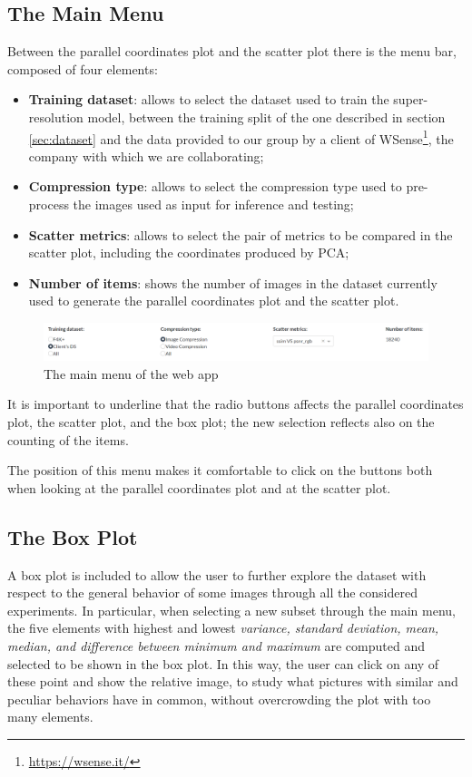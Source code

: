 \documentclass[12pt]{article}
\begin{document}
	\subsection{The Main Menu}\label{sec:menu}

	Between the parallel coordinates plot and the scatter plot there is the menu bar, composed of four elements:
	\begin{itemize}
		\item \textbf{Training dataset}: allows to select the dataset used to train the super-resolution model, between the training split of the one described in section \ref{sec:dataset} and the data provided to our group by a client of WSense\footnote{\url{https://wsense.it/}}, the company with which we are collaborating;
		\item \textbf{Compression type}: allows to select the compression type used to pre-process the images used as input for inference and testing;
		\item \textbf{Scatter metrics}: allows to select the pair of metrics to be compared in the scatter plot, including the coordinates produced by PCA;
		\item \textbf{Number of items}: shows the number of images in the dataset currently used to generate the parallel coordinates plot and the scatter plot.
	\end{itemize}

	\begin{figure}[h!]
		\centering
		\includegraphics[width=0.7\linewidth]{imgs/menu}
		\caption{The main menu of the web app}
		\label{fig:menu}
	\end{figure}

	It is important to underline that the radio buttons affects the parallel coordinates plot, the scatter plot, and the box plot; the new selection reflects also on the counting of the items.

	The position of this menu makes it comfortable to click on the buttons both when looking at the parallel coordinates plot and at the scatter plot.


	\subsection{The Box Plot}\label{sec:box}
	
	A box plot is included to allow the user to further explore the dataset with respect to the general behavior of some images through all the considered experiments. In particular, when selecting a new subset through the main menu, the five elements with highest and lowest \textit{variance, standard deviation, mean, median, and difference between minimum and maximum} are computed and selected to be shown in the box plot.
	In this way, the user can click on any of these point and show the relative image, to study what pictures with similar and peculiar behaviors have in common, without overcrowding the plot with too many elements.
	
\end{document}
